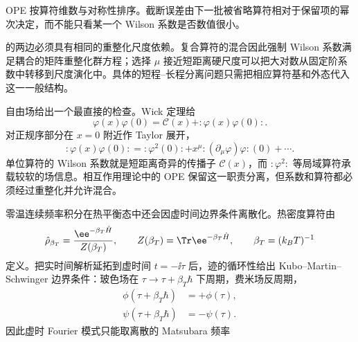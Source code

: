 OPE 按算符维数与对称性排序。截断误差由下一批被省略算符相对于保留项的幂次决定，而不能只看某一个 Wilson 系数是否数值很小。

 的两边必须具有相同的重整化尺度依赖。复合算符的混合因此强制 Wilson 系数满足耦合的矩阵重整化群方程；选择 $\mu$ 接近短距离硬尺度可以把大对数从固定阶系数中转移到尺度演化中。具体的短程--长程分离问题只需把相应算符基和外态代入这一一般结构。

自由场给出一个最直接的检查。Wick 定理给
\begin{equation*}
 \varphi(x)\varphi(0)
 =\mathcal C(x)+:\!\varphi(x)\varphi(0)\!:.
\end{equation*}
对正规序部分在 $x=0$ 附近作 Taylor 展开，
\begin{equation*}
 :\!\varphi(x)\varphi(0)\!:
 =:\!\varphi^2(0)\!:
 +x^\mu:\!(\partial_\mu\varphi)\varphi\!:(0)+\cdots.
\end{equation*}
单位算符的 Wilson 系数就是短距离奇异的传播子 $\mathcal C(x)$，而 $:\!\varphi^2\!:$ 等局域算符承载较软的场信息。相互作用理论中的 OPE 保留这一职责分离，但系数和算符都必须经过重整化并允许混合。

零温连续频率积分在热平衡态中还会因虚时间边界条件离散化。热密度算符由
\begin{equation*}
 \hat\rho_{\beta_T}=\frac{\ee^{-\beta_T\hat H}}{Z(\beta_T)},
 \qquad Z(\beta_T)=\Tr \ee^{-\beta_T\hat H},
 \qquad \beta_T=(k_BT)^{-1}
\end{equation*}
定义。把实时间解析延拓到虚时间 $t=-\ii\tau$ 后，迹的循环性给出 Kubo--Martin--Schwinger 边界条件：玻色场在 $\tau\to\tau+\beta_T\hbar$ 下周期，费米场反周期，
\begin{align}
 \phi(\tau+\beta_T\hbar)&=+\phi(\tau),\\
 \psi(\tau+\beta_T\hbar)&=-\psi(\tau).
 \label{eq:matsubara-boundary-dp11}
\end{align}
因此虚时 Fourier 模式只能取离散的 Matsubara 频率


